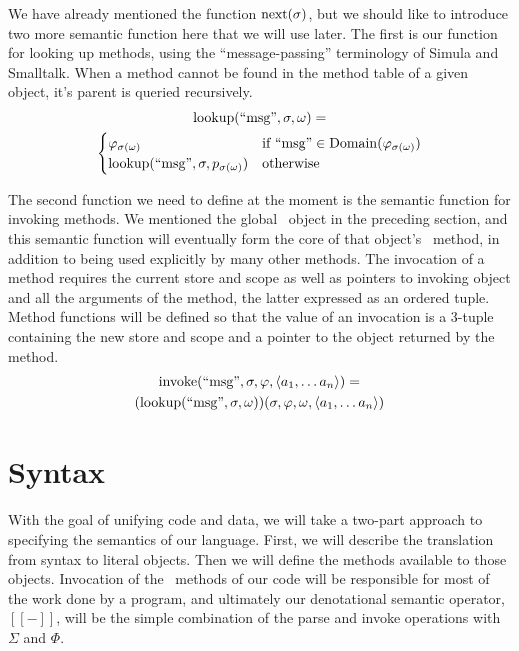 \documentclass[twocolumn]{article}
\begin{document}
We have already mentioned the function $\operatorname{next}(\sigma)$, but we should
like to introduce two more semantic function here that we will use
later. The first is our function for looking up methods, using the
``message-passing'' terminology of Simula and Smalltalk. When a method
cannot be found in the method table of a given object, it's parent is
queried recursively.
\begin{multline*} \operatorname{lookup}(\text{``msg''}, \sigma, \omega) = \\
\begin{cases}
  \varphi_{\sigma(\omega)} &\text{if } \text{``msg''} \in
  \operatorname{Domain}(\varphi_{\sigma(\omega)}) \\
    \operatorname{lookup}(\text{``msg''},\sigma,p_{\sigma(\omega)}) &\text{otherwise}
  \end{cases}
\end{multline*}

The second function we need to define at the moment is the semantic
function for invoking methods. We mentioned the global \msg\ object in
the preceding section, and this semantic function will eventually form
the core of that object's \call\ method, in addition to being used
explicitly by many other methods. The invocation of a method requires
the current store and scope as well as pointers to invoking object and
all the arguments of the method, the latter expressed as an ordered
tuple. Method functions will be defined so that the value of an
invocation is a 3-tuple containing the new store and scope and a
pointer to the object returned by the method.
\begin{multline*}
  \operatorname{invoke}( \text{``msg''}, \sigma, \varphi, \left< a_1,\ldots a_n\right>) = \\
  (\operatorname{lookup}(\text{``msg''}, \sigma, \omega))(\sigma,\varphi,\omega,
  \left< a_1,\ldots a_n \right> )
\end{multline*}
  
\section*{Syntax}

With the goal of unifying code and data, we will take a two-part
approach to specifying the semantics of our language. First, we will
describe the translation from syntax to literal objects. Then we will
define the methods available to those objects. Invocation of the
\eval\ methods of our code will be responsible for most of the work
done by a program, and ultimately our denotational semantic operator,
$[\![-]\!]$, will be the simple combination of the parse and invoke
operations with $\Sigma$ and $\Phi$.
\end{document}
